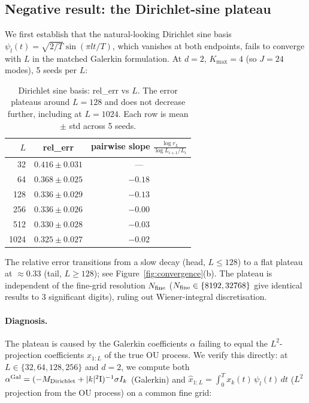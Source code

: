 \subsection{Negative result: the Dirichlet-sine plateau}
\label{sec:exp:dirichlet-plateau}

We first establish that the natural-looking Dirichlet sine basis
$\psi_l(t) = \sqrt{2/T}\sin(\pi l t/T)$, which vanishes at both
endpoints, fails to converge with $L$ in the matched Galerkin
formulation. At $d = 2$, $K_{\max} = 4$ (so $J = 24$ modes), 5 seeds
per $L$:

\begin{table}[h]
\centering
\caption{Dirichlet sine basis: rel\_err vs $L$. The error plateaus
around $L = 128$ and does not decrease further, including at $L = 1024$.
Each row is mean $\pm$ std across 5 seeds.}
\label{tab:dirichlet-plateau}
\begin{tabular}{rcc}
\toprule
$L$ & rel\_err & pairwise slope $\frac{\log r_L}{\log L_{i+1}/L_i}$ \\
\midrule
32   & $0.416 \pm 0.031$ & --- \\
64   & $0.368 \pm 0.025$ & $-0.18$ \\
128  & $0.336 \pm 0.029$ & $-0.13$ \\
256  & $0.336 \pm 0.026$ & $-0.00$ \\
512  & $0.330 \pm 0.028$ & $-0.03$ \\
1024 & $0.325 \pm 0.027$ & $-0.02$ \\
\bottomrule
\end{tabular}
\end{table}

The relative error transitions from a slow decay (head, $L \le 128$)
to a flat plateau at $\approx 0.33$ (tail, $L \ge 128$); see
Figure~\ref{fig:convergence}(b). The plateau
is independent of the fine-grid resolution $N_{\rm fine}$
($N_{\rm fine} \in \{8192, 32768\}$ give identical results to 3
significant digits), ruling out Wiener-integral discretisation.

\paragraph{Diagnosis.}
The plateau is caused by the Galerkin coefficients $\alpha$ failing to
equal the $L^2$-projection coefficients $\hat x_{1:L}$ of the true OU
process. We verify this directly: at $L \in \{32, 64, 128, 256\}$ and
$d = 2$, we compute both
$\alpha^{\rm Gal} = (-M_{\rm Dirichlet} + |k|^2 \mathrm{I})^{-1}\sigma I_k$
(Galerkin) and
$\hat x_{1:L} = \int_0^T x_k(t)\,\psi_l(t)\, dt$
($L^2$ projection from the OU process) on a common fine grid:

